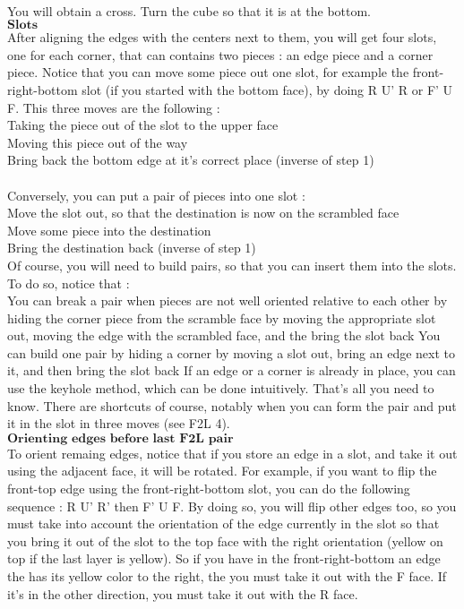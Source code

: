 \documentclass{article}
\begin{document}
\\You will obtain a cross. Turn the cube so that it is at the bottom.
\\$\textbf{Slots}$\\After aligning the edges with the centers next to them, you will get four slots, one for each corner, that can contains two pieces : an edge piece and a corner piece. Notice that you can move some piece out one slot, for example the front-right-bottom slot (if you started with the bottom face), by doing R U' R or F' U F. This three moves are the following :
\\Taking the piece out of the slot to the upper face
\\Moving this piece out of the way
\\Bring back the bottom edge at it's correct place (inverse of step 1)
\\\\Conversely, you can put a pair of pieces into one slot :
\\Move the slot out, so that the destination is now on the scrambled face
\\Move some piece into the destination
\\Bring the destination back (inverse of step 1)
\\Of course, you will need to build pairs, so that you can insert them into the slots. To do so, notice that :
\\You can break a pair when pieces are not well oriented relative to each other by hiding the corner piece from the scramble face by moving the appropriate slot out, moving the edge with the scrambled face, and the bring the slot back
You can build one pair by hiding a corner by moving a slot out, bring an edge next to it, and then bring the slot back
If an edge or a corner is already in place, you can use the keyhole method, which can be done intuitively. That's all you need to know. There are shortcuts of course, notably when you can form the pair and put it in the slot in three moves (see F2L 4).
\\$\textbf{Orienting edges before last F2L pair}$\\To orient remaing edges, notice that if you store an edge in a slot, and take it out using the adjacent face, it will be rotated. For example, if you want to flip the front-top edge using the front-right-bottom slot, you can do the following sequence : R U' R' then F' U F.
By doing so, you will flip other edges too, so you must take into account the orientation of the edge currently in the slot so that you bring it out of the slot to the top face with the right orientation (yellow on top if the last layer is yellow). So if you have in the front-right-bottom an edge the has its yellow color to the right, the you must take it out with the F face. If it's in the other direction, you must take it out with the R face.
\end{document}
